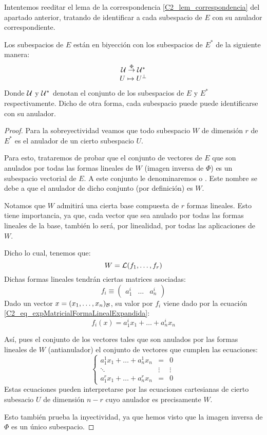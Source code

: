 Intentemos reeditar el lema de la correspondencia \ref{C2_lem_correspondencia} del apartado anterior, tratando de identificar a cada subespacio de $E$ con su anulador correspondiente.
\begin{lem}
	\label{C2_lem_correspondenciaAnulador}
	Los subespacios de $E$ están en biyección con los subespacios de $E^*$ de la siguiente manera:
	\[\begin{array}{c}
	\mathcal{U}\stackrel{\Phi}{\to}\mathcal{U}^*\\
	U\mapsto U^{\perp}
	\end{array}\]
	Donde $\mathcal{U}$ y $\mathcal{U}^*$ denotan el conjunto de los subespacios de $E$ y $E^*$ respectivamente.
	Dicho de otra forma, cada subespacio puede puede identificarse con su anulador.
\end{lem}
\begin{proof}
	Para la sobreyectividad veamos que todo subespacio $W$ de dimensión $r$ de $E^*$ es el anulador de un cierto subespacio $U$.
	
	Para esto, trataremos de probar que el conjunto de vectores de $E$ que son anulados por todas las formas lineales de $W$ (imagen inversa de $\Phi$) es un subespacio vectorial de $E$. A este conjunto le denominaremos  o . Este nombre se debe a que el anulador de dicho conjunto (por definición) es $W$.
	
	Notamos que $W$ admitirá una cierta base compuesta de $r$ formas lineales. Esto tiene importancia, ya que, cada vector que sea anulado por todas las formas lineales de la base, también lo será, por linealidad, por todas las aplicaciones de $W$.
	
	Dicho lo cual, tenemos que:
	\[W=\mathcal{L}(f_1,\dots,f_r)\]
	Dichas formas lineales tendrán ciertas matrices asociadas:
	\[f_i\equiv\begin{pmatrix}
	a_1^i & \dots & a_n^i
	\end{pmatrix}\]
	Dado un vector $x=(x_1,\dots,x_n)_{\mathcal{B}}$, su valor por $f_i$ viene dado por la ecuación  \eqref{C2_eq_expMatricialFormaLinealExpandida}:
	\[f_i(x)=a_1^ix_1+\dots+a_n^ix_n\]
	
	Así, pues el conjunto de los vectores tales que son anulados por las formas lineales de $W$ (antianulador)  el conjunto de vectores que cumplen las ecuaciones:
	\begin{equation}
	\label{C2_eq_ecuacionesAtianulador}
	\left\{\begin{array}{ccc}
	a_1^1x_1+\dots+a_n^1x_n&=&0\\
	\ddots& \vdots & \vdots\\
	a_1^rx_1+\dots+a_n^rx_n&=&0
	\end{array}\right.\end{equation}
	Estas ecuaciones pueden interpretarse por las ecuaciones cartesianas de cierto subesacio $U$ de dimensión $n-r$ cuyo anulador es precisamente $W$.
	
	Esto también prueba la inyectividad, ya que hemos visto que la imagen inversa de $\Phi$ es un único subespacio.
\end{proof}
